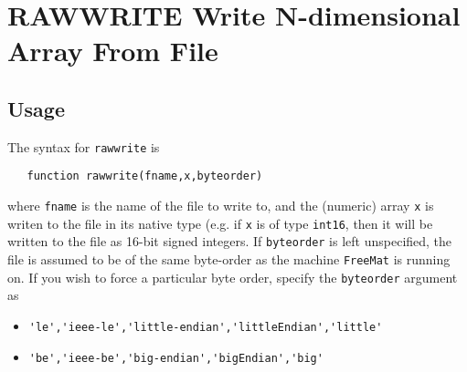 \section{RAWWRITE Write N-dimensional Array From File}

\subsection{Usage}

The syntax for \verb|rawwrite| is
\begin{verbatim}
   function rawwrite(fname,x,byteorder)
\end{verbatim}
where \verb|fname| is the name of the file to write to, and the
(numeric) array \verb|x| is writen to the file in its native
type (e.g. if \verb|x| is of type \verb|int16|, then it will be written
to the file as 16-bit signed integers.  If \verb|byteorder| is
left unspecified, the file is assumed to be
of the same byte-order as the machine \verb|FreeMat| is running on.
If you wish to force a particular byte order, specify the \verb|byteorder|
argument as
\begin{itemize}
\item  \verb|'le','ieee-le','little-endian','littleEndian','little'|

\item  \verb|'be','ieee-be','big-endian','bigEndian','big'|

\end{itemize}
